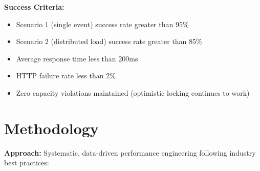\documentclass[12pt,a4paper,oneside]{report}
\begin{document}
\textbf{Success Criteria:}
\begin{itemize}[leftmargin=1.5em,topsep=0.3em,itemsep=0.2em]
    \item Scenario 1 (single event) success rate greater than 95\%
    \item Scenario 2 (distributed load) success rate greater than 85\%
    \item Average response time less than 200ms
    \item HTTP failure rate less than 2\%
    \item Zero capacity violations maintained (optimistic locking continues to work)
\end{itemize}

\section{Methodology}

\textbf{Approach:} Systematic, data-driven performance engineering following industry best practices:
\end{document}
